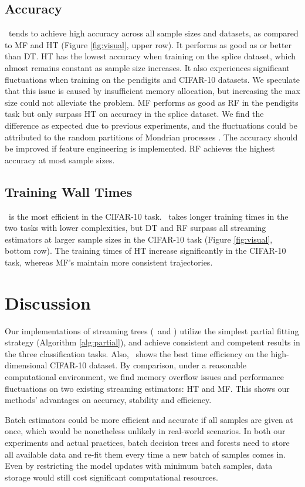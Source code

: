 \subsection{Accuracy}
\SDF~tends to achieve high accuracy across all sample sizes and datasets, as compared to MF and HT (Figure \ref{fig:visual}, upper row). It performs as good as or better than DT. 
HT has the lowest accuracy when training on the splice dataset, which almost remains constant as sample size increases. It also experiences significant fluctuations when training on the pendigits and CIFAR-10 datasets. We speculate that this issue is caused by insufficient memory allocation, but increasing the max size could not alleviate the problem.
MF performs as good as RF in the pendigits task but only surpass HT on accuracy in the splice dataset. We find the difference as expected due to previous experiments, and the fluctuations could be attributed to the random partitions of Mondrian processes \citep{mondrian, roy2009mondrian}. The accuracy should be improved if feature engineering is implemented.
RF achieves the highest accuracy at most sample sizes.

\subsection{Training Wall Times}
\SDT~is the most efficient in the CIFAR-10 task. \SDF~takes longer training times in the two tasks with lower complexities, but DT and RF surpass all streaming estimators at larger sample sizes in the CIFAR-10 task (Figure \ref{fig:visual}, bottom row). The training times of HT increase significantly in the CIFAR-10 task, whereas MF's maintain more consistent trajectories. 

\section{Discussion}
\label{discussion}
Our implementations of streaming trees (\SDT~and \SDF) utilize the simplest partial fitting strategy (Algorithm \ref{alg:partial}), and achieve consistent and competent results in the three classification tasks. Also, \SDT~shows the best time efficiency on the high-dimensional CIFAR-10 dataset. By comparison, under a reasonable computational environment, we find memory overflow issues and performance fluctuations on two existing streaming estimators: HT and MF. This shows our methods' advantages on accuracy, stability and efficiency. 

Batch estimators could be more efficient and accurate if all samples are given at once, which would be nonetheless unlikely in real-world scenarios. In both our experiments and actual practices, batch decision trees and forests need to store all available data and re-fit them every time a new batch of samples comes in. Even by restricting the model updates with minimum batch samples, data storage would still cost significant computational resources. 

